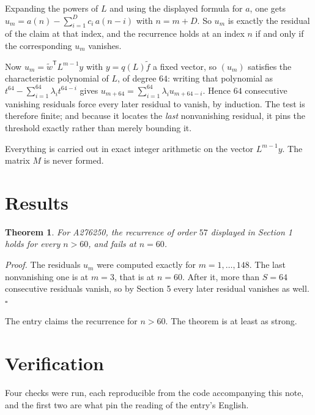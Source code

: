 \documentclass[11pt]{article}
\newtheorem{theorem}{Theorem}
\theoremstyle{definition}
\begin{document}
Expanding the powers of $L$ and using the displayed formula for $a$, one gets $u_m = a(n) - \sum_{i=1}^{D} c_i\,a(n-i)$ with $n = m + D$. So $u_m$ is exactly the residual of the claim at that index, and the recurrence holds at an index $n$ if and only if the corresponding $u_m$ vanishes.

Now $u_m = \tilde w^{\mathsf T} L^{m-1} y$ with $y = q(L)\tilde f$ a fixed vector, so $(u_m)$ satisfies the characteristic polynomial of $L$, of degree $64$: writing that polynomial as $t^{64} - \sum_{i=1}^{64} \lambda_i t^{64-i}$ gives $u_{m+64} = \sum_{i=1}^{64} \lambda_i u_{m+64-i}$. Hence $64$ consecutive vanishing residuals force every later residual to vanish, by induction. The test is therefore finite; and because it locates the {\itshape last} nonvanishing residual, it pins the threshold exactly rather than merely bounding it.

Everything is carried out in exact integer arithmetic on the vector $L^{m-1}y$. The matrix $M$ is never formed.

\section{Results}

\begin{theorem} For A276250, the recurrence of order $57$ displayed in Section 1 holds for every $n > 60$, and fails at $n = 60$.\end{theorem}

{\itshape Proof.} The residuals $u_m$ were computed exactly for $m = 1,\dots,148$. The last nonvanishing one is at $m = 3$, that is at $n = 60$. After it, more than $S = 64$ consecutive residuals vanish, so by Section 5 every later residual vanishes as well. $\square$

The entry claims the recurrence for $n > 60$. The theorem is at least as strong.

\section{Verification}

Four checks were run, each reproducible from the code accompanying this note, and the first two are what pin the reading of the entry's English.
\end{document}
